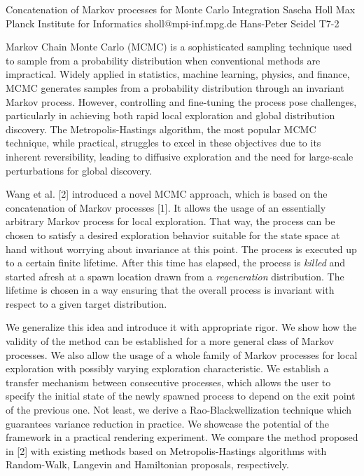 \begin{talk}
  {Concatenation of Markov processes for Monte Carlo Integration}%
  {Sascha Holl}%
  {Max Planck Institute for Informatics}%
  {sholl@mpi-inf.mpg.de}%
  {Hans-Peter Seidel}%
  {T7-2}%

Markov Chain Monte Carlo (MCMC) is a sophisticated sampling technique used to sample from a probability distribution when conventional methods are impractical. Widely applied in statistics, machine learning, physics, and finance, MCMC generates samples from a probability distribution through an invariant Markov process. However, controlling and fine-tuning the process pose challenges, particularly in achieving both rapid local exploration and global distribution discovery. The Metropolis-Hastings algorithm, the most popular MCMC technique, while practical, struggles to excel in these objectives due to its inherent reversibility, leading to diffusive exploration and the need for large-scale perturbations for global discovery.

Wang et al. [2] introduced a novel MCMC approach, which is based on the concatenation of Markov processes [1]. It allows the usage of an essentially arbitrary Markov process for local exploration. That way, the process can be chosen to satisfy a desired exploration behavior suitable for the state space at hand without worrying about invariance at this point. The process is executed up to a certain finite lifetime. After this time has elapsed, the process is \textit{killed} and started afresh at a spawn location drawn from a \textit{regeneration} distribution. The lifetime is chosen in a way ensuring that the overall process is invariant with respect to a given target distribution.

We generalize this idea and introduce it with appropriate rigor. We show how the validity of the method can be established for a more general class of Markov processes. We also allow the usage of a whole family of Markov processes for local exploration with possibly varying exploration characteristic. We establish a transfer mechanism between consecutive processes, which allows the user to specify the initial state of the newly spawned process to depend on the exit point of the previous one. Not least, we derive a Rao-Blackwellization technique which guarantees variance reduction in practice.
We showcase the potential of the framework in a practical rendering experiment. We compare the method proposed in [2] with existing methods based on Metropolis-Hastings algorithms with Random-Walk, Langevin and Hamiltonian proposals, respectively.


\end{talk}
